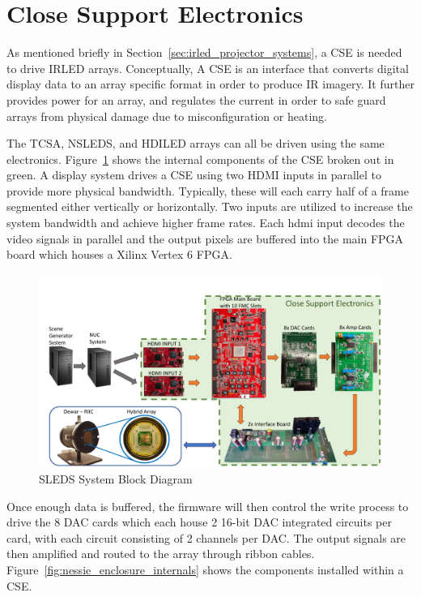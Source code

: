 \section{Close Support Electronics}
    \label{sec:close_support_electronics}
    As mentioned briefly in Section~\ref{sec:irled_projector_systems}, a CSE is needed to drive IRLED arrays. Conceptually, A CSE is an interface that converts digital display data to an array specific format in order to produce IR imagery. It further provides power for an array, and regulates the current in order to safe guard arrays from physical damage due to misconfiguration or heating.

    The TCSA, NSLEDS, and HDILED arrays can all be driven using the same electronics. Figure~\ref{fig:sleds_block} shows the internal components of the CSE broken out in green. A display system drives a CSE using two HDMI inputs in parallel to provide more physical bandwidth. Typically, these will each carry half of a frame segmented either vertically or horizontally. Two inputs are utilized to increase the system bandwidth and achieve higher frame rates. Each hdmi input decodes the video signals in parallel and the output pixels are buffered into the main FPGA board which houses a Xilinx Vertex 6 FPGA\cite{XILINX1}.

    \begin{figure}
        \centering
        \includegraphics[width=1.0\textwidth]{fig/sleds_block.pdf}
        \caption{SLEDS System Block Diagram}
        \label{fig:sleds_block}
    \end{figure}

    Once enough data is buffered, the firmware will then control the write process to drive the 8 DAC cards which each house 2 16-bit DAC integrated circuits per card, with each circuit consisting of 2 channels per DAC. The output signals are then amplified and routed to the array through ribbon cables. Figure~\ref{fig:nessie_enclosure_internals} shows the components installed within a CSE.

